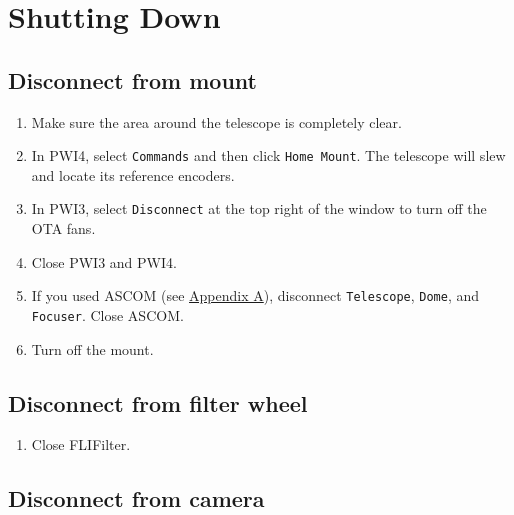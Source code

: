\documentclass{article}
\begin{document}
	\newpage
	\section{Shutting Down}
	\label{sec:shutting-down}
	
	\subsection{Disconnect from mount}
	\label{sec:disconnect-from-mount}
	
	\begin{enumerate}
		
		\item Make sure the area around the telescope is completely clear.
		
		\item In PWI4, select \texttt{Commands} and then click \texttt{Home Mount}. The telescope will slew and locate its reference encoders.
		
		\item In PWI3, select \texttt{Disconnect} at the top right of the window to turn off the OTA fans.
		
		\item Close PWI3 and PWI4.
		
		\item If you used ASCOM (see \hyperref[sec:set-up-ascom]{Appendix A}), disconnect \texttt{Telescope}, \texttt{Dome}, and \texttt{Focuser}. Close ASCOM.
		
		\item Turn off the mount.
		
	\end{enumerate}

	\subsection{Disconnect from filter wheel}
	\label{sec:disconnect-from-filter-wheel}
	
	\begin{enumerate}
		
		\item Close FLIFilter.
		
	\end{enumerate}
	
	\subsection{Disconnect from camera}
	\label{sec:disconnect-from-camera}
	
\end{document}

